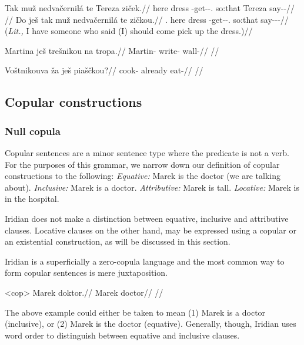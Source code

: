 \pex
\a\begingl
    \gla Tak muž nedvačernilá te Tereza ziček.//
    \glb here dress \Caus{}-get-\Pv{}-\Subj{}.\Ipf{} so:that Tereza say-\Av{}-\Pf{}//
    \glft {}//
  \endgl
\a\begingl
    \gla Do ješ tak muž nedvačernilá te zičkou.//
    \glb \First{}\Sg{}.\Acc{} \Exst{} here dress \Caus{}-get-\Pv{}-\Subj{}.\Ipf{} so:that say-\Av{}-\Pf{}-\Nz{}//
    \glft {} (\emph{Lit.,} I have someone who said (I) should come pick up the dress.)//
  \endgl
\xe


\pex
\begingl
\gla Martina ješ trešnikou na tropa.//
\glb Martin-\Acc{} \Exst{} write- \Loc{} wall-\Acc{}//
\glft {}//
\endgl
\xe

\pex
\begingl
\gla Voštnikouva ža ješ piaščkou?//
\glb cook- already \Exst{} eat-//
\glft {}//
\endgl
\xe

\subsection{Copular constructions}
\subsubsection{Null copula}

Copular sentences are a minor sentence type where the predicate is not a verb. For the purposes of this grammar, we narrow down our definition of copular constructions to the following:
\pex
\a \textit{Equative:} Marek is the doctor (we are talking about).
\a \textit{Inclusive:} Marek is a doctor.
\a \textit{Attributive:} Marek is tall.
\a \textit{Locative:} Marek is in the hospital.
\xe

Iridian does not make a distinction between equative, inclusive and attributive clauses. Locative clauses on the other hand, may be expressed using a copular or an existential construction, as will be discussed in this section.

Iridian is a superficially a zero-copula language and the most common way to form copular sentences is mere juxtaposition.

\pex<cop>
\begingl
\gla Marek doktor.//
\glb Marek doctor//
\glft {}//
\endgl
\xe

The above example could either be taken to mean (1) Marek is a doctor (inclusive), or (2) Marek is the doctor (equative). Generally, though, Iridian uses word order to distinguish between equative and inclusive clauses.

